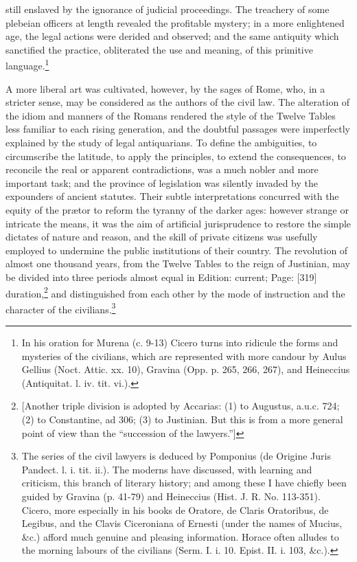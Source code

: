 still enslaved by the ignorance of judicial proceedings. The treachery of some plebeian officers at length revealed the profitable mystery; in a more enlightened age, the legal actions were derided and observed; and the same antiquity which sanctified the practice, obliterated the use and meaning, of this primitive language.\footnote{In his oration for Murena (c. 9-13) Cicero turns into ridicule the forms and mysteries of the civilians, which are represented with more candour by Aulus Gellius (Noct. Attic. xx. 10), Gravina (Opp. p. 265, 266, 267), and Heineccius (Antiquitat. l. iv. tit. vi.).}

A more liberal art was cultivated, however, by the sages of Rome, who, in a stricter sense, may be considered as the authors of the civil law. The alteration of the idiom and manners of the Romans rendered the style of the Twelve Tables less familiar to each rising generation, and the doubtful passages were imperfectly explained by the study of legal antiquarians. To define the ambiguities, to circumscribe the latitude, to apply the principles, to extend the consequences, to reconcile the real or apparent contradictions, was a much nobler and more important task; and the province of legislation was silently invaded by the expounders of ancient statutes. Their subtle interpretations concurred with the equity of the prætor to reform the tyranny of the darker ages: however strange or intricate the means, it was the aim of artificial jurisprudence to restore the simple dictates of nature and reason, and the skill of private citizens was usefully employed to undermine the public institutions of their country. The revolution of almost one thousand years, from the Twelve Tables to the reign of Justinian, may be divided into three periods almost equal in Edition: current; Page: [319] duration,\footnote{[Another triple division is adopted by Accarias: (1) to Augustus, a.u.c. 724; (2) to Constantine, ad 306; (3) to Justinian. But this is from a more general point of view than the \texthebrew{“}succession of the lawyers.\texthebrew{}”]} and distinguished from each other by the mode of instruction and the character of the civilians.\footnote{The series of the civil lawyers is deduced by Pomponius (de Origine Juris Pandect. l. i. tit. ii.). The moderns have discussed, with learning and criticism, this branch of literary history; and among these I have chiefly been guided by Gravina (p. 41-79) and Heineccius (Hist. J. R. No. 113-351). Cicero, more especially in his books de Oratore, de Claris Oratoribus, de Legibus, and the Clavis Ciceroniana of Ernesti (under the names of Mucius, \&c.) afford much genuine and pleasing information. Horace often alludes to the morning labours of the civilians (Serm. I. i. 10. Epist. II. i. 103, \&c.).

}
